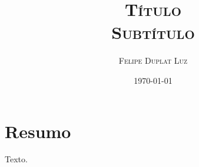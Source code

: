 \documentclass{article}
\title{\textbf{\textsc{Título}} \\ \Large \textsc{Subtítulo}}
\author{\textsc{Felipe Duplat Luz}}
\date{\textsc{\today}}
\begin{document}
	\maketitle

\section*{Resumo}
\setlength\parskip{0.3cm}

Texto. \cite{jones71,samuelson71}



\pagebreak
\printbibliography[title={Referências:}]
\end{document}
